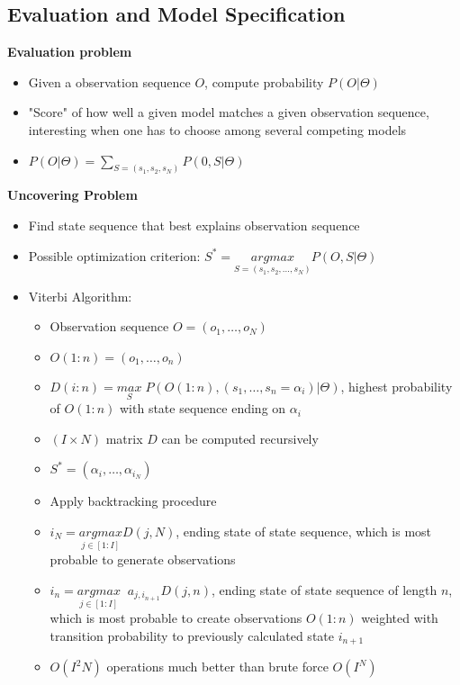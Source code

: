 \documentclass{scrartcl}
\begin{document}
\subsection*{Evaluation and Model Specification}
\textbf{Evaluation problem}
\begin{itemize}
    \item
        Given a observation sequence $O$, compute probability $P(O|\Theta)$
    \item
        "Score" of how well a given model matches a given observation sequence, interesting when one has to choose among several competing models
    \item
        $P(O|\Theta) = \sum_{S=(s_1, s_2, s_N)} P(0, S|\Theta)$
\end{itemize}
\textbf{Uncovering Problem}
\begin{itemize}
    \item
        Find state sequence that best explains observation sequence 
    \item
        Possible optimization criterion:
        $S^* = \underset{S = (s_1, s_2, \dots, s_N)}{argmax} P(O,S|\Theta)$
    \item
        Viterbi Algorithm:
        \begin{itemize}
            \item
                Observation sequence $O=(o_1, \dots, o_N)$
            \item
                $O(1:n) = (o_1, \dots, o_n)$
            \item
                $D(i:n) = \underset{S}{max} \; P(O(1:n), (s_1, \dots, s_n=\alpha_i)|\Theta)$, highest probability of $O(1:n)$ with state sequence ending on $\alpha_i$
            \item
                $(I \times N)$ matrix $D$ can be computed recursively\\
            \item
                $ S^* = (\alpha_i, \dots, \alpha_{i_N})$
            \item
                Apply backtracking procedure
            \item
                $i_N = \underset{j \in [1:I]}{argmax} D(j, N)$, ending state of state sequence, which is most probable to generate observations
            \item
                $i_n = \underset{j \in [1:I]}{argmax} \; \; a_{j, i_{n+1}}D(j, n)$, ending state of state sequence of length $n$, which is most probable to create observations $O(1:n)$ weighted with transition probability to previously calculated state $i_{n+1}$\\
            \item
                $O(I^2 N)$ operations much better than brute force $O(I^N)$
        \end{itemize}
\end{itemize}
\end{document}
